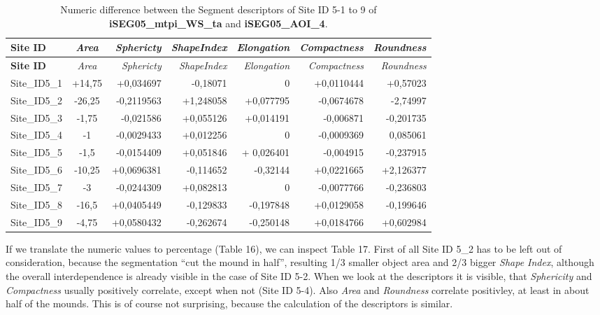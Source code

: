 \documentclass[
  12pt,
]{article}
\begin{document}
\begin{longtable}[]{@{}lcrrrrr@{}}
\caption{Numeric difference between the Segment descriptors of Site ID 5-1 to 9 of \textbf{iSEG05\_mtpi\_WS\_ta} and \textbf{iSEG05\_AOI\_4}.}\tabularnewline
\toprule
\textbf{Site ID} & \emph{Area} & \emph{Sphericty} & \emph{ShapeIndex} & \emph{Elongation} & \emph{Compactness} & \emph{Roundness} \\
\midrule
\endfirsthead
\toprule
\textbf{Site ID} & \emph{Area} & \emph{Sphericty} & \emph{ShapeIndex} & \emph{Elongation} & \emph{Compactness} & \emph{Roundness} \\
\midrule
\endhead
Site\_ID5\_1 & +14,75 & +0,034697 & -0,18071 & 0 & +0,0110444 & +0,57023 \\
Site\_ID5\_2 & -26,25 & -0,2119563 & +1,248058 & +0,077795 & -0,0674678 & -2,74997 \\
Site\_ID5\_3 & -1,75 & -0,021586 & +0,055126 & +0,014191 & -0,006871 & -0,201735 \\
Site\_ID5\_4 & -1 & -0,0029433 & +0,012256 & 0 & -0,0009369 & 0,085061 \\
Site\_ID5\_5 & -1,5 & -0,0154409 & +0,051846 & + 0,026401 & -0,004915 & -0,237915 \\
Site\_ID5\_6 & -10,25 & +0,0696381 & -0,114652 & -0,32144 & +0,0221665 & +2,126377 \\
Site\_ID5\_7 & -3 & -0,0244309 & +0,082813 & 0 & -0,0077766 & -0,236803 \\
Site\_ID5\_8 & -16,5 & +0,0405449 & -0,129833 & -0,197848 & +0,0129058 & -0,199646 \\
Site\_ID5\_9 & -4,75 & +0,0580432 & -0,262674 & -0,250148 & +0,0184766 & +0,602984 \\
\bottomrule
\end{longtable}

If we translate the numeric values to percentage (Table 16), we can inspect Table 17. First of all Site ID 5\_2 has to be left out of consideration, because the segmentation ``cut the mound in half'', resulting 1/3 smaller object area and 2/3 bigger \emph{Shape Index}, although the overall interdependence is already visible in the case of Site ID 5-2.
When we look at the descriptors it is visible, that \emph{Sphericity} and \emph{Compactness} usually positively correlate, except when not (Site ID 5-4). Also \emph{Area} and \emph{Roundness} correlate positivley, at least in about half of the mounds. This is of course not surprising, because the calculation of the descriptors is similar.
\end{document}

